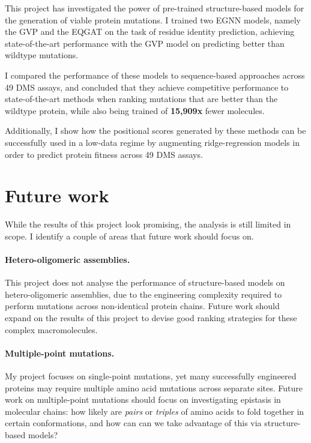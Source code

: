 This project has investigated the power of pre-trained structure-based models for the generation of viable protein mutations. I trained two EGNN models, namely the GVP \cite{gvp2} and the EQGAT \cite{eqgat2} on the task of residue identity prediction, achieving state-of-the-art performance with the GVP model on predicting better than wildtype mutations. 

I compared the performance of these models to sequence-based approaches across 49 DMS assays, and concluded that they achieve competitive performance to state-of-the-art methods when ranking mutations that are better than the wildtype protein, while also being trained of \textbf{15,909x} fewer molecules. 

Additionally, I show how the positional scores generated by these methods can be successfully used in a low-data regime by augmenting ridge-regression models in order to predict protein fitness across 49 DMS assays.

\section{Future work}
While the results of this project look promising, the analysis is still limited in scope. I identify a couple of areas that future work should focus on.

\paragraph{Hetero-oligomeric assemblies.} This project does not analyse the performance of structure-based models on hetero-oligomeric assemblies, due to the engineering complexity required to perform mutations across non-identical protein chains. Future work should expand on the results of this project to devise good ranking strategies for these complex macromolecules. 

\paragraph{Multiple-point mutations.} My project focuses on single-point mutations, yet many successfully engineered proteins may require multiple amino acid mutations across separate sites. Future work on multiple-point mutations should focus on investigating epistasis in molecular chains: how likely are \textit{pairs} or \textit{triples} of amino acids to fold together in certain conformations, and how can can we take advantage of this via structure-based models?

